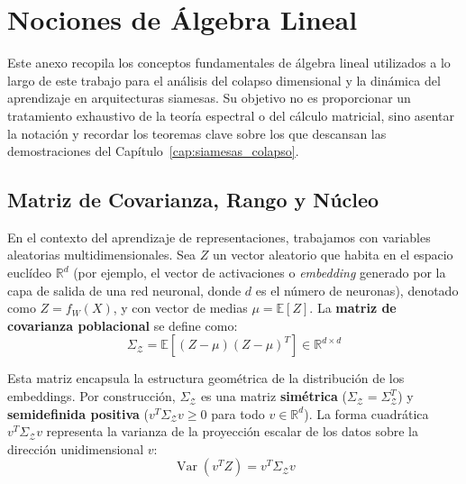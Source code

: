 \chapter{Nociones de Álgebra Lineal}
\label{ap:algebra_lineal}

Este anexo recopila los conceptos fundamentales de álgebra lineal utilizados a lo largo de este trabajo para el análisis del colapso dimensional y la dinámica del aprendizaje en arquitecturas siamesas. Su objetivo no es proporcionar un tratamiento exhaustivo de la teoría espectral o del cálculo matricial, sino asentar la notación y recordar los teoremas clave sobre los que descansan las demostraciones del Capítulo~\ref{cap:siamesas_colapso}.

\section{Matriz de Covarianza, Rango y Núcleo}
\label{sec:al_covarianza_rango}

En el contexto del aprendizaje de representaciones, trabajamos con variables aleatorias multidimensionales. Sea $Z$ un vector aleatorio que habita en el espacio euclídeo $\mathbb{R}^d$ (por ejemplo, el vector de activaciones o \textit{embedding} generado por la capa de salida de una red neuronal, donde $d$ es el número de neuronas), denotado como $Z = f_W(X)$, y con vector de medias $\mu = \mathbb{E}[Z]$. La \textbf{matriz de covarianza poblacional} se define como:
\begin{equation}
    \Sigma_\mathcal{Z} = \mathbb{E}\left[(Z - \mu)(Z - \mu)^T\right] \in \mathbb{R}^{d \times d}
\end{equation}

Esta matriz encapsula la estructura geométrica de la distribución de los embeddings. Por construcción, $\Sigma_\mathcal{Z}$ es una matriz \textbf{simétrica} ($\Sigma_\mathcal{Z} = \Sigma_\mathcal{Z}^T$) y \textbf{semidefinida positiva} ($v^T \Sigma_\mathcal{Z} v \ge 0$ para todo $v \in \mathbb{R}^d$). La forma cuadrática $v^T \Sigma_\mathcal{Z} v$ representa la varianza de la proyección escalar de los datos sobre la dirección unidimensional $v$:
\begin{equation}
    \operatorname{Var}(v^T Z) = v^T \Sigma_\mathcal{Z} v
\end{equation}

